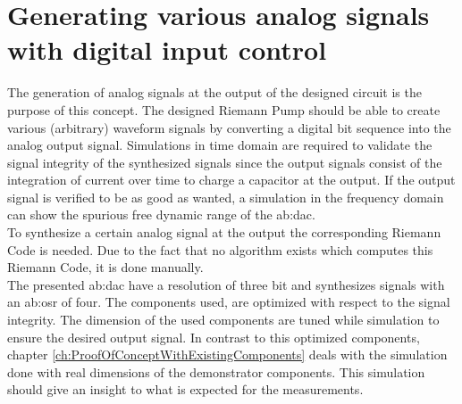 \section{Generating various analog signals with digital input control}
The generation of analog signals at the output of the designed circuit is the purpose of this concept.
 The designed Riemann Pump should be able to create various (arbitrary) waveform signals by converting a digital bit sequence into the analog output signal.
Simulations in time domain are required to validate the signal integrity of the synthesized signals since the output signals consist of the integration of current over time to charge a capacitor at the output.
  If the output signal is verified to be as good as wanted, a simulation in the frequency domain can show the spurious free dynamic range of the \gls{ab:dac}.\\
To synthesize a certain analog signal at the output the corresponding Riemann Code is needed.
Due to the fact that no algorithm exists which computes this Riemann Code, it is done manually.\\ 
 The presented \gls{ab:dac} have a resolution of three bit and synthesizes signals with an \gls{ab:osr} of four. 
  The components used, are optimized with respect to the signal integrity. 
  The dimension of the used components are tuned while simulation to ensure the desired output signal.
  In contrast to this optimized components, chapter \ref{ch:ProofOfConceptWithExistingComponents} deals with the simulation done with real dimensions of the demonstrator components. 
  This simulation should give an insight to what is expected for the measurements.
 
